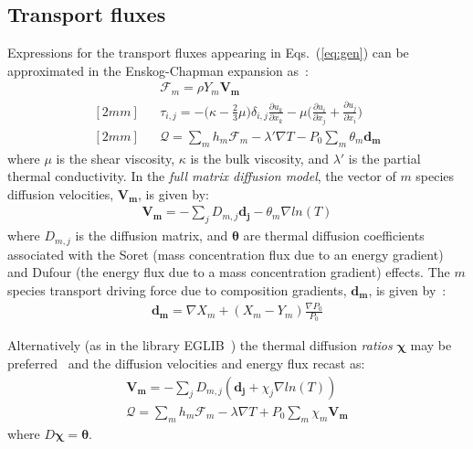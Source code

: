 \subsection{Transport fluxes}
\label{sub:DifFluxes}
Expressions for the transport fluxes appearing in Eqs.~(\ref{eq:gen}) can be approximated in the Enskog-Chapman expansion as~\cite{Ern:1994multicomponent}:
 \begin{eqnarray*}
&&\boldsymbol{\mathcal{F}}_{m} = \rho Y_m \boldsymbol{V_m}
\\ [2mm]
&&\tau_{i,j} = - \Big(\kappa - \frac{2}{3} \mu \Big) \delta_{i,j} \frac{\partial {u_k}}{\partial x_k} - \mu \Big(\frac{\partial u_i}{\partial x_j} + \frac{\partial u_j}{\partial x_i}\Big)
\\ [2mm]
&&\boldsymbol{\mathcal{Q}} =  \sum_m h_m \boldsymbol{\mathcal{F}}_{m}  - \lambda' \nabla T - P_0 \sum_m \theta_m \boldsymbol{d_m}
\end{eqnarray*}
where $\mu$ is the shear viscosity, $\kappa$ is the bulk viscosity, and $\lambda'$ is the partial thermal conductivity. In the \textit{full matrix diffusion model}, the vector of $m$ species diffusion velocities, $\boldsymbol{V_m}$, is given by:
 \begin{eqnarray*}
\boldsymbol{V_m} = - \sum_j  {D}_{m,j} \boldsymbol{d_j} - \theta_m \nabla ln(T)
\end{eqnarray*}
where ${D}_{m,j}$ is the diffusion matrix, and $\boldsymbol{\theta}$ are thermal diffusion coefficients associated with the Soret (mass concentration flux due to an energy gradient) and Dufour (the energy flux due to a mass concentration gradient) effects. The $m$ species transport driving force due to composition gradients, $\boldsymbol{d_m}$, is given by~\cite{Ern:1994multicomponent}:
 \begin{eqnarray*}
\boldsymbol{d_m} = \nabla X_m + (X_m -Y_m) \frac{\nabla P_0}{P_0}
\label{dmeqs}
\end{eqnarray*}

Alternatively (as in the library EGLIB~\cite{EGLIB}) the thermal diffusion \emph{ratios} $\boldsymbol{\chi}$ may be preferred~\cite{Ern:1994multicomponent} and the diffusion velocities and energy flux recast as:
 \begin{eqnarray}
\boldsymbol{V_m} = - \sum_j  {D}_{m,j} ( \boldsymbol{d_j} + \chi_j \nabla ln(T))
\\
\boldsymbol{\mathcal{Q}} =  \sum_m h_m \boldsymbol{\mathcal{F}}_{m}  - \lambda \nabla T + P_0 \sum_m \chi_m \boldsymbol{V_m}
\end{eqnarray}
where  ${D} \boldsymbol{\chi} = \boldsymbol{\theta}$.

